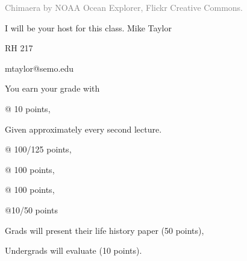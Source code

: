 \documentclass[t]{beamer}
\begin{document}


{
\begin{frame}[b,plain]
	\hfill\tiny\textcolor{gray}{Chimaera by NOAA Ocean Explorer, Flickr Creative Commons.}
\end{frame}
}

{
\begin{frame}[t,plain]{I will be your host for this class.}
	\vspace{5ex}
	\hangpara\hspace{17em} Mike Taylor

	\hangpara\hspace{17em} RH 217

	\hangpara\hspace{17em} mtaylor@semo.edu

\end{frame}
}

\begin{frame}[t,plain]{You earn your grade with }

	\hangpara {} @ 10 points, 

	\hspace{2em} Given approximately every second lecture.

	\hangpara {} @ 100/125 points, 

	\hangpara {} @ 100 points,
	
	\hangpara {} @ 100 points,
	
	\hangpara {} @10/50 points
	
	\hspace{2em} Grads will present their life history paper (50 points),
	
	\hspace{2em} Undergrads will evaluate (10 points).

\end{frame}
\end{document}
